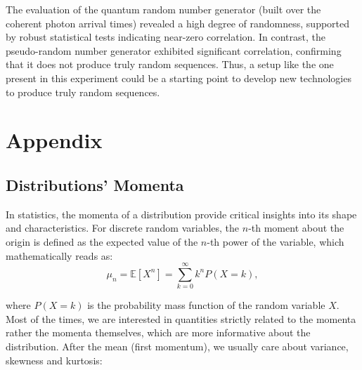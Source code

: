 \documentclass[prl,twocolumn]{revtex4-1}
\begin{document}
The evaluation of the quantum random number generator (built over the coherent photon arrival times) revealed a high degree of randomness, supported by robust statistical tests indicating near-zero correlation. In contrast, the pseudo-random number generator exhibited significant correlation, confirming that it does not produce truly random sequences. Thus, a setup like the one present in this experiment could be a starting point to develop new technologies to produce truly random sequences.


\section{Appendix}
\subsection{Distributions' Momenta}
\label{sec:appendix_momenta}
In statistics, the momenta of a distribution provide critical insights into its shape and characteristics. For discrete random variables, the \(n\)-th moment about the origin is defined as the expected value of the \(n\)-th power of the variable, which mathematically reads as:
%
\begin{equation}
    \mu_n = \mathbb{E}[X^n] = \sum_{k=0}^{\infty} k^n P(X = k),
\end{equation}

where \(P(X = k)\) is the probability mass function of the random variable \(X\). Most of the times, we are interested in quantities strictly related to the momenta rather the momenta themselves, which are more informative about the distribution. After the mean (first momentum), we usually care about variance, skewness and kurtosis:
\end{document}
